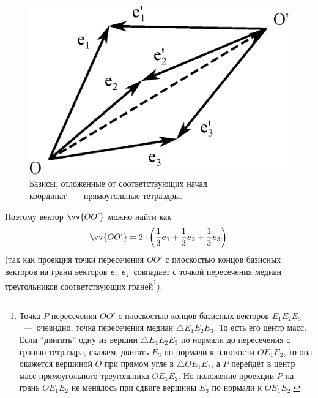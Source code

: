 \documentclass[a4paper,12pt]{article}
\begin{document}
\begin{solution}
    \begin{figure}[h]
      \centering
    
      \includegraphics[width=0.5\columnwidth]{many-vectors-kisses}
    
      \caption{Базисы, отложенные от соответствующих начал координат~---~прямоугольные тетраэдры.}
      \label{fig:many-vectors-kisses}
    \end{figure}  %
    
    Поэтому вектор $\vv{OO'}$ можно найти как
    \[
      \vv{OO'} = 2 \cdot \left(\frac{1}{3} \bds e_1 + \frac{1}{3} \bds e_2 + \frac{1}{3} \bds e_3\right)
    \]
    (так как проекция точки пересечения $OO'$ с плоскостью концов базисных векторов на грани векторов $\boldsymbol e_i, \boldsymbol e_j$ совпадает с точкой пересечения медиан треугольников соответствующих граней\footnote{Точка $P$ пересечения $OO'$ с плоскостью концов базисных векторов $E_1 E_2 E_3$~---~очевидно, точка пересечения медиан $\triangle E_1 E_2 E_3$. То есть его центр масс. Если ``двигать'' одну из вершин $\triangle E_1 E_2 E_3$ по нормали до пересечения с гранью тетраэдра, скажем, двигать $E_3$ по нормали к плоскости $O E_1 E_2$, то она окажется вершиной $O$ при прямом угле в $\triangle O E_1 E_2$, а $P$ перейдёт в центр масс прямоугольного треугольника $O E_1 E_2$. Но положение проекции $P$ на грань $O E_1 E_2$ не менялось при сдвиге вершины $E_3$ по нормали к $O E_1 E_2$.}).
    

\end{solution}
\end{document}
